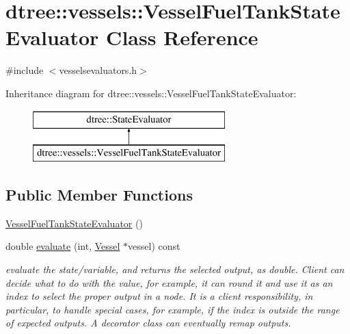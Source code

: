 \hypertarget{classdtree_1_1vessels_1_1_vessel_fuel_tank_state_evaluator}{}\section{dtree\+::vessels\+::Vessel\+Fuel\+Tank\+State\+Evaluator Class Reference}
\label{classdtree_1_1vessels_1_1_vessel_fuel_tank_state_evaluator}


{\ttfamily \#include $<$vesselsevaluators.\+h$>$}

Inheritance diagram for dtree\+::vessels\+::Vessel\+Fuel\+Tank\+State\+Evaluator\+:\begin{figure}[H]
\begin{center}
\leavevmode
\includegraphics[height=2.000000cm]{d4/d1f/classdtree_1_1vessels_1_1_vessel_fuel_tank_state_evaluator}
\end{center}
\end{figure}
\subsection*{Public Member Functions}
\begin{DoxyCompactItemize}
\item 
\mbox{\hyperlink{classdtree_1_1vessels_1_1_vessel_fuel_tank_state_evaluator_a15b02ee1cf8c0228c06e26f8969a8c5a}{Vessel\+Fuel\+Tank\+State\+Evaluator}} ()
\item 
double \mbox{\hyperlink{classdtree_1_1vessels_1_1_vessel_fuel_tank_state_evaluator_aa388165dec1352d15d55b1ad7e09ef71}{evaluate}} (int, \mbox{\hyperlink{class_vessel}{Vessel}} $\ast$vessel) const
\begin{DoxyCompactList}\small\item\em evaluate the state/variable, and returns the selected output, as double. Client can decide what to do with the value, for example, it can round it and use it as an index to select the proper output in a node. It is a client responsibility, in particular, to handle special cases, for example, if the index is outside the range of expected outputs. A decorator class can eventually remap outputs. \end{DoxyCompactList}\end{DoxyCompactItemize}


